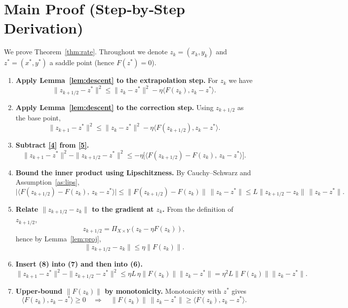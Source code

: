 \documentclass{article}
\newcommand{\proj}[2]{\Pi_{#1}\!\left(#2\right)}
\begin{document}
\section*{Main Proof (Step‑by‑Step Derivation)}
We prove Theorem~\ref{thm:rate}.  Throughout we denote $z_{k}=(x_{k},y_{k})$ and
$z^{*}=(x^{*},y^{*})$ a saddle point (hence $F(z^{*})=0$).

\begin{enumerate}[label=[Step \arabic*], leftmargin=*]
\item \textbf{Apply Lemma~\ref{lem:descent} to the extrapolation step.}  
For $z_{k}$ we have
\[
\|z_{k+1/2}-z^{*}\|^{2}\le\|z_{k}-z^{*}\|^{2}-\eta\langle F(z_{k}),z_{k}-z^{*}\rangle .
\tag{4}
\]

\item \textbf{Apply Lemma~\ref{lem:descent} to the correction step.}  
Using $z_{k+1/2}$ as the base point,
\[
\|z_{k+1}-z^{*}\|^{2}\le\|z_{k}-z^{*}\|^{2}
-\eta\langle F(z_{k+1/2}),z_{k}-z^{*}\rangle .
\tag{5}
\]

\item \textbf{Subtract \eqref{4} from \eqref{5}.}  
\[
\|z_{k+1}-z^{*}\|^{2}-\|z_{k+1/2}-z^{*}\|^{2}
\le -\eta\bigl[\langle F(z_{k+1/2})-F(z_{k}),\,z_{k}-z^{*}\rangle\bigr].
\tag{6}
\]

\item \textbf{Bound the inner product using Lipschitzness.}  
By Cauchy–Schwarz and Assumption~\ref{as:lips},
\[
\bigl|\langle F(z_{k+1/2})-F(z_{k}),\,z_{k}-z^{*}\rangle\bigr|
\le \|F(z_{k+1/2})-F(z_{k})\|\,\|z_{k}-z^{*}\|
\le L\|z_{k+1/2}-z_{k}\|\,\|z_{k}-z^{*}\|.
\tag{7}
\]

\item \textbf{Relate $\|z_{k+1/2}-z_{k}\|$ to the gradient at $z_{k}$.}  
From the definition of $z_{k+1/2}$,
\[
z_{k+1/2}= \proj{X\times Y}{z_{k}-\eta F(z_{k})},
\]
hence by Lemma~\ref{lem:proj},
\[
\|z_{k+1/2}-z_{k}\|\le \eta\|F(z_{k})\|.
\tag{8}
\]

\item \textbf{Insert (8) into (7) and then into (6).}  
\[
\|z_{k+1}-z^{*}\|^{2}-\|z_{k+1/2}-z^{*}\|^{2}
\le \eta L\,\eta\|F(z_{k})\|\|z_{k}-z^{*}\|
= \eta^{2}L\|F(z_{k})\|\|z_{k}-z^{*}\|.
\tag{9}
\]

\item \textbf{Upper‑bound $\|F(z_{k})\|$ by monotonicity.}  
Monotonicity with $z^{*}$ gives
\[
\langle F(z_{k}),z_{k}-z^{*}\rangle\ge0
\quad\Longrightarrow\quad
\|F(z_{k})\|\,\|z_{k}-z^{*}\|\ge\langle F(z_{k}),z_{k}-z^{*}\rangle .
\tag{10}
\]


\end{enumerate}
\end{document}
